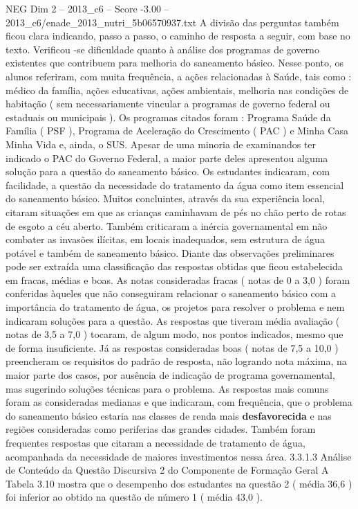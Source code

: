 \begin{textsample}{NEG Dim 2 – 2013\_c6 – Score -3.00 – 2013\_c6/enade\_2013\_nutri\_5b06570937.txt}
A divisão das perguntas também ficou clara indicando, passo a passo, o caminho de resposta a seguir, com base no texto.
Verificou -se dificuldade quanto à análise dos programas de governo existentes que contribuem para melhoria do saneamento básico.
Nesse ponto, os alunos referiram, com muita frequência, a ações relacionadas à Saúde, tais como : médico da família, ações educativas, ações ambientais, melhoria nas condições de habitação ( sem necessariamente vincular a programas de governo federal ou estaduais ou municipais ).
Os programas citados foram : Programa Saúde da Família ( PSF ), Programa de Aceleração do Crescimento ( PAC ) e Minha Casa Minha Vida e, ainda, o SUS.
Apesar de uma minoria de examinandos ter indicado o PAC do Governo Federal, a maior parte deles apresentou alguma solução para a questão do saneamento básico.
Os estudantes indicaram, com facilidade, a questão da necessidade do tratamento da água como item essencial do saneamento básico.
Muitos concluintes, através da sua experiência local, citaram situações em que as crianças caminhavam de pés no chão perto de rotas de esgoto a céu aberto.
Também criticaram a inércia governamental em não combater as invasões ilícitas, em locais inadequados, sem estrutura de água potável e também de saneamento básico.
Diante das observações preliminares pode ser extraída uma classificação das respostas obtidas que ficou estabelecida em fracas, médias e boas.
As notas consideradas fracas ( notas de 0 a 3,0 ) foram conferidas àqueles que não conseguiram relacionar o saneamento básico com a importância do tratamento de água, os projetos para resolver o problema e nem indicaram soluções para a questão.
As respostas que tiveram média avaliação ( notas de 3,5 a 7,0 ) tocaram, de algum modo, nos pontos indicados, mesmo que de forma insuficiente.
Já as respostas consideradas boas ( notas de 7,5 a 10,0 ) preencheram os requisitos do padrão de resposta, não logrando nota máxima, na maior parte dos casos, por ausência de indicação de programa governamental, mas sugerindo soluções técnicas para o problema.
As respostas mais comuns foram as consideradas medianas e que indicaram, com frequência, que o problema do saneamento básico estaria nas classes de renda mais \textbf{desfavorecida} e nas regiões consideradas como periferias das grandes cidades.
Também foram frequentes respostas que citaram a necessidade de tratamento de água, acompanhada da necessidade de maiores investimentos nessa área. 3.3.1.3 Análise de Conteúdo da Questão Discursiva 2 do Componente de Formação Geral A Tabela 3.10 mostra que o desempenho dos estudantes na questão 2 ( média 36,6 ) foi inferior ao obtido na questão de número 1 ( média 43,0 ).

\end{textsample}
